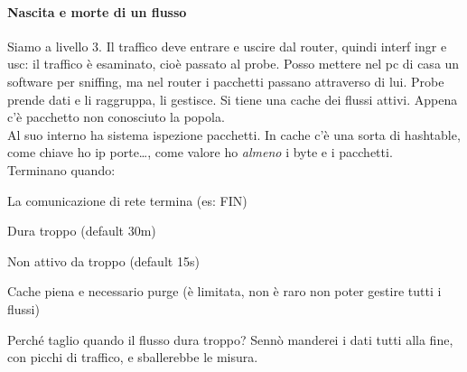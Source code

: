 \documentclass[10pt]{book}
\begin{document}
\paragraph{Nascita e morte di un flusso} Siamo a livello 3. Il traffico deve entrare e uscire dal router, quindi interf ingr e usc: il traffico è esaminato, cioè passato al probe. Posso mettere nel pc di casa un software per sniffing, ma nel router i pacchetti passano attraverso di lui. Probe prende dati e li raggruppa, li gestisce. Si tiene una cache dei flussi attivi. Appena c'è pacchetto non conosciuto la popola.\\Al suo interno ha sistema ispezione pacchetti. In cache c'è una sorta di hashtable, come chiave ho ip porte\ldots, come valore ho \textit{almeno} i byte e i pacchetti.\\
Terminano quando:
\begin{list}{}{}
	\item La comunicazione di rete termina (es: FIN)
	\item Dura troppo (default 30m)
	\item Non attivo da troppo (default 15s)
	\item Cache piena e necessario purge (è limitata, non è raro non poter gestire tutti i flussi)
\end{list}
Perché taglio quando il flusso dura troppo? Sennò manderei i dati tutti alla fine, con picchi di traffico, e sballerebbe le misura.
\end{document}
